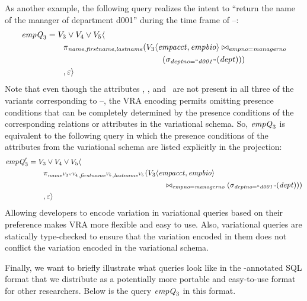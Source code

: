 As another example, the following query realizes the intent to ``return the
name of the manager of department d001'' during the time frame of
\vThree--\vFive:
%
\begin{align*}
\eq_3 &= \vThree\vee\vFour\vee\vFive \langle\\
&\qquad  \pi_{\name,\fname,\lname} 
({\chc[\vThree]{\empacct,\empbio}}
          \bowtie_{\empno=\managerno}\\
&\qquad \qquad \qquad \qquad \qquad \qquad \qquad {(\vSel[\deptno=\deptOne]{(\dept)})}
)\\
&\qquad           ,
  \empRel \rangle
\end{align*}
%
\noindent
Note that even though the attributes \name, \fname, and \lname\ are not present
in all three of the variants corresponding to \vThree--\vFive, the VRA encoding
permits omitting presence conditions that can be completely determined by the
presence conditions of the corresponding relations or attributes in the
variational schema. So, $\eq_3$ is equivalent to the following query in which the
presence conditions of the attributes from the variational schema are listed
explicitly in the projection:
%
\begin{align*}
\VVal {\eq_3} &= \vThree\vee\vFour\vee\vFive \langle\\
&\qquad  \pi_{\oatt{\name}{\vThree\vee\vFour},\oatt{\fname}{\vFive},\oatt{\lname}{\vFive}} 
  ({\chc[\vThree]{\empacct,\empbio}} \\
  &\hspace{180pt} \bowtie_{\empno=\managerno} {(\vSel[\deptno=\deptOne]{(\dept)})}
           )\\
&\qquad  ,\empRel \rangle
\end{align*}
%
%
 \noindent
Allowing developers to encode variation in variational queries based on their
preference makes VRA more flexible and easy to use. 
Also, variational queries are statically type-checked to ensure that
the variation encoded in them does not conflict the variation encoded
in the variational schema. 

 Finally, we want to briefly illustrate what queries look like in the
 -annotated SQL format that we distribute as a potentially more
 portable and easy-to-use format for other researchers. Below is the query $\eq_3$
 in this format.

